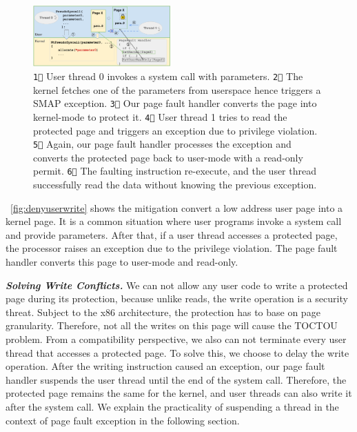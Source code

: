 \begin{figure}[th]
  \includegraphics[width=0.47\textwidth]{figures/denyuserwrite3}
  \centering
  \caption{\texttt{\textcircled{1}} User thread 0 invokes a system call with parameters. \texttt{\textcircled{2}} The kernel fetches one of the parameters from userspace hence triggers a SMAP exception. \texttt{\textcircled{3}} Our page fault handler converts the page into kernel-mode to protect it. \texttt{\textcircled{4}} User thread 1 tries to read the protected page and triggers an exception due to privilege violation.  \texttt{\textcircled{5}} Again, our page fault handler processes the exception and converts the protected page back to user-mode with a read-only permit. \texttt{\textcircled{6}} The faulting instruction re-execute, and the user thread successfully read the data without knowing the previous exception.}
  \label{fig:denyuserwrite}
\end{figure}



~\autoref{fig:denyuserwrite} shows the mitigation convert a low address user page into a kernel page. It is a common situation where user programs invoke a system call and provide parameters. After that, if a user thread accesses a protected page, the processor raises an exception due to the privilege violation. The page fault handler converts this page to user-mode and read-only.



\textbf{\textit{Solving Write Conflicts.}} We can not allow any user code to write a protected page during its protection,  because unlike reads, the write operation is a security threat. Subject to the x86 architecture, the protection has to base on page granularity.  Therefore, not all the writes on this page will cause the TOCTOU problem. From a compatibility perspective, we also can not terminate every user thread that accesses a protected page. To solve this, we choose to delay the write operation. After the writing instruction caused an exception, our page fault handler suspends the user thread until the end of the system call. Therefore, the protected page remains the same for the kernel, and user threads can also write it after the system call.  We explain the practicality of suspending a thread in the context of page fault exception in the following section.

